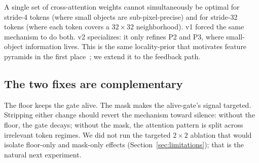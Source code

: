 A single set of cross-attention weights cannot simultaneously be optimal for stride-4 tokens (where small objects are sub-pixel-precise) and for stride-32 tokens (where each token covers a $32{\times}32$ neighborhood). v1 forced the same mechanism to do both. v2 specializes: it only refines P2 and P3, where small-object information lives. This is the same locality-prior that motivates feature pyramids in the first place~\cite{lin2017fpn}; we extend it to the feedback path.

\subsection{The two fixes are complementary}

The floor keeps the gate alive. The mask makes the alive-gate's signal targeted. Stripping either change should revert the mechanism toward silence: without the floor, the gate decays; without the mask, the attention pattern is split across irrelevant token regimes. We did not run the targeted $2{\times}2$ ablation that would isolate floor-only and mask-only effects (Section~\ref{sec:limitations}); that is the natural next experiment.

